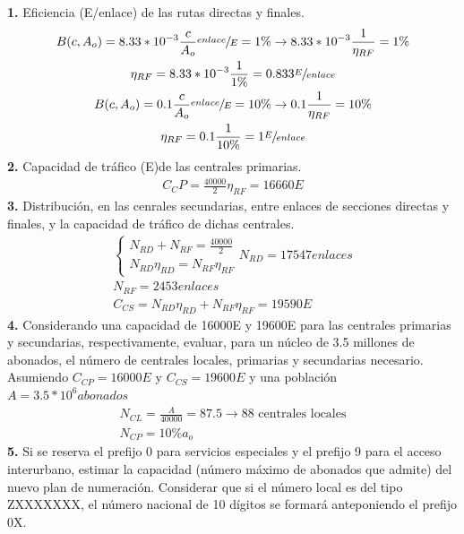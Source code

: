 \begin{exercise}[7]
\begin{itemize}
\end{itemize}
\textbf{1.} Eficiencia (E/enlace) de las rutas directas y finales.\\
\begin{gather*}
B(c,A_o)=8.33*10^{-3}\frac{c}{A_o}\sfrac{enlace}{E}=1\% \to 8.33*10^{-3}\frac{1}{\eta_{RF}}=1\% \\
\eta_{RF}=8.33*10^{-3}\frac{1}{1\%}=0.833\sfrac{E}{enlace}\\
B(c,A_o)=0.1\frac{c}{A_o}\sfrac{enlace}{E}=10\% \to 0.1\frac{1}{\eta_{RF}}=10\% \\
\eta_{RF}=0.1\frac{1}{10\%}=1\sfrac{E}{enlace}
\end{gather*}
\textbf{2.} Capacidad de tráfico (E)de las centrales primarias.\\
\begin{gather*}
C_CP=\frac{40000}{2}\eta_{RF}=16660E
\end{gather*}
\textbf{3.} Distribución, en las cenrales secundarias, entre enlaces de secciones directas y finales, y la capacidad de tráfico de dichas centrales.\\
\begin{gather*}
\begin{cases}
N_{RD}+N_{RF}=\frac{40000}{2}\\
N_{RD}\eta_{RD}=N_{RF}\eta_{RF}
\end{cases}
N_{RD}=17547enlaces\\
N_{RF}=2453enlaces\\
C_{CS}=N_{RD}\eta_{RD}+N_{RF}\eta_{RF}=19590E
\end{gather*}
\textbf{4.} Considerando una capacidad de 16000E y 19600E para las centrales primarias y secundarias, respectivamente, evaluar, para un núcleo de 3.5 millones de abonados, el número de centrales locales, primarias y secundarias necesario.\\
Asumiendo $C_{CP}=16000E$ y $C_{CS}=19600E$ y una población $A=3.5*10^6abonados$
\begin{gather*}
N_{CL}=\frac{A}{40000}=87.5\to88\text{ centrales locales}\\
N_{CP}=10\% a_o
\end{gather*}
\textbf{5.} Si se reserva el prefijo 0 para servicios especiales y el prefijo 9 para el acceso interurbano, estimar la capacidad (número máximo de abonados que admite) del nuevo plan de numeración. Considerar que si el número local es del tipo ZXXXXXXX, el número nacional de 10 dígitos se formará anteponiendo el prefijo 0X.\\
\end{exercise}
